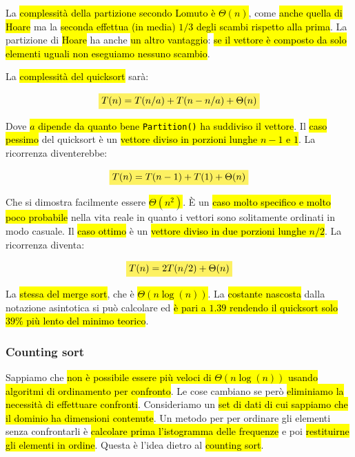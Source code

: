 \documentclass[a4paper,11pt,oneside]{article}
\theoremstyle{plain}
\theoremstyle{definition}
\theoremstyle{remark}
\newcommand{\mhl}[1]{\colorbox{hlcolor}{$\displaystyle #1$}}
\begin{document}
La \hl{complessità della partizione secondo Lomuto è $\Theta(n)$}, come
\hl{anche quella di Hoare} ma la \hl{seconda effettua (in media) $1/3$ degli
scambi rispetto alla prima}. La partizione di \hl{Hoare} ha anche \hl{un altro
vantaggio}: \hl{se il vettore è composto da solo elementi uguali non eseguiamo
nessuno scambio}.

La \hl{complessità del quicksort} sarà:

\begin{equation}
  \mhl{
    T(n) = T(n/a) + T(n - n/a) + \Theta(n)
  }
\end{equation}

Dove \hl{$a$ dipende da quanto bene \texttt{Partition()} ha suddiviso il
vettore}. Il \hl{caso pessimo} del quicksort è un \hl{vettore diviso in porzioni
lunghe $n-1$ e $1$}. La ricorrenza diventerebbe:

\begin{equation}
  \mhl{
    T(n) = T(n-1) + T(1) + \Theta(n)
  }
\end{equation}

Che si dimostra facilmente essere \hl{$\Theta(n^2)$}. È un \hl{caso molto
specifico e molto poco probabile} nella vita reale in quanto i vettori sono
solitamente ordinati in modo casuale. Il \hl{caso ottimo} è un \hl{vettore
diviso in due porzioni lunghe $n/2$}. La ricorrenza diventa:

\begin{equation}
  \mhl{
    T(n) = 2T(n/2) + \Theta(n)
  }
\end{equation}

La \hl{stessa del merge sort}, che è \hl{$\Theta(n\log(n))$}. La \hl{costante
nascosta} dalla notazione asintotica si può calcolare ed \hl{è pari a $1.39$
rendendo il quicksort solo $39\%$ più lento del minimo teorico}.

\subsubsection{Counting sort}\label{sec:counting-sort}

Sappiamo che \hl{non è possibile essere più veloci di $\Theta(n\log(n))$ usando
algoritmi di ordinamento per confronto}. Le cose cambiano se però \hl{eliminiamo
la necessità di effettuare confronti}. Consideriamo un \hl{set di dati di cui
sappiamo che il dominio ha dimensioni contenute}. Un metodo per per ordinare gli
elementi senza confrontarli è \hl{calcolare prima l'istogramma delle frequenze}
e poi \hl{restituirne gli elementi in ordine}. Questa è l'idea dietro al
\hl{counting sort}.
\end{document}
